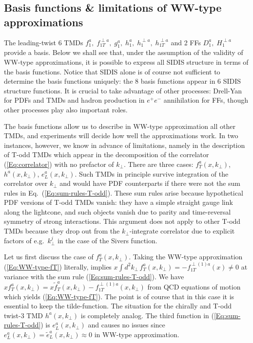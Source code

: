 \documentclass[a4paper,11pt]{article}
\def\kperp{k_\perp}
\begin{document}
\subsection{Basis functions \& limitations of WW-type approximations}
\label{Sec-3.7:basis+limitations}

The leading-twist 6 TMDs 
$f_1^a, \; f_{1T}^{\perp a}, \; g_1^a, \; h_1^a, \;h_1^{\perp a},\; h_{1T}^{\perp a}$
and 2 FFs $D_1^a, \; H_1^{\perp a}$ provide a basis.
Below we shall see that, under the assumption of the validity of WW-type 
approximations, it is possible to express all SIDIS structure
in terms of the basis functions. 
Notice that SIDIS alone is of course not sufficient to determine the basis
functions uniquely: the 8 basis functions appear in 6 SIDIS structure functions.
It is crucial to take advantage of other processes: Drell-Yan for PDFs and TMDs
and hadron production in $e^+e^-$ annihilation for FFs, though other processes 
play also important roles.

The basis functions allow us to describe in WW-type approximation all other 
TMDs, and experiments will decide how well the approximations work.
In two instances, however, we know in advance of limitations, namely in the
description of T-odd TMDs which appear in the decomposition of the 
correlator (\ref{Eq:correlator}) with no prefactor of $\kperp$.
There are three cases: $f_T^a(x,k_\perp)$, $h^a(x,\kperp)$, $e_L^a(x,\kperp)$.
Such TMDs in principle survive integration of the correlator over $\kperp$
and would have PDF counterparts if there were not the sum rules in 
Eq.~(\ref{Eq:sum-rules-T-odd}). These sum rules arise because hypothetical
PDF versions of T-odd TMDs vanish: they have a simple straight gauge link
along the lightcone, and such objects vanish due to parity and time-reversal 
symmetry of strong interactions. This argument does not apply to other T-odd 
TMDs because they drop out from the $\kperp$-integrate correlator due to 
explicit factors of e.g.\ $\kperp^j$ in the case of the Sivers function.

Let us first discuss the case of $f_T^a(x,k_\perp)$. Taking the  
WW-type approximation (\ref{Eq:WW-type-fT}) literally, implies
$x\int d^2 k_\perp\,f_T^a(x,k_\perp)=-f_{1T}^{\perp(1)a}(x) \neq 0$ 
at variance with the sum rule (\ref{Eq:sum-rules-T-odd}). We 
have $xf_T^a(x,k_\perp)=x\tilde{f}_T^a(x,k_\perp)-f_{1T}^{\perp(1)a}(x,k_\perp)$ 
from QCD equations of motion \cite{Bacchetta:2006tn} which yields
(\ref{Eq:WW-type-fT}). The point is of course 
that in this case it is essential to keep the tilde-function. 
The situation for the chirally and T-odd twist-3 
TMD $h^a(x,k_\perp)$ is completely analog. The third function in
(\ref{Eq:sum-rules-T-odd}) is $e_L^a(x,k_\perp)$ and causes no issues
since $e_L^a(x,k_\perp)=\tilde{e}_L^a(x,k_\perp)\approx0$ in WW-type approximation.
\end{document}
